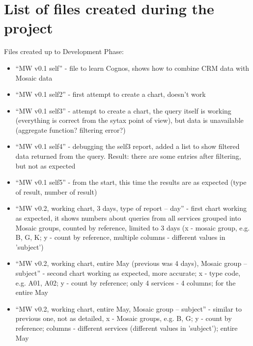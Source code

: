 \chapter{List of files created during the project}

Files created up to Development Phase:
\begin{itemize}
\item “MW v0.1 self” - file to learn Cognos, shows how to combine CRM data with Mosaic data
\item “MW v0.1 self2” - first attempt to create a chart, doesn't work
\item “MW v0.1 self3” - attempt to create a chart, the query itself is working (everything is correct from the sytax point of view), but data is unavailable (aggregate function? filtering error?)
\item “MW v0.1 self4” - debugging the self3 report, added a list to show filtered data returned from the query. Result: there are some entries after filtering, but not as expected
\item “MW v0.1 self5” - from the start, this time the results are as expected (type of result, number of result)
\item “MW v0.2, working chart, 3 days, type of report – day” - first chart working as expected, it shows numbers about queries from all services grouped into Mosaic groups, counted by reference, limited to 3 days (x - mosaic group, e.g. B, G, K; y - count by reference, multiple columns - different values in 'subject')
\item “MW v0.2, working chart, entire May (previous was 4 days), Mosaic group – subject” - second chart working as expected, more accurate; x - type code, e.g. A01, A02; y - count by reference; only 4 services - 4 columns; for the entire May
\item “MW v0.2, working chart, entire May, Mosaic group – subject” - similar to previous one, not as detailed, x - Mosaic groups, e.g. B, G; y - count by reference; columns - different services (different values in 'subject'); entire May
\end{itemize}


